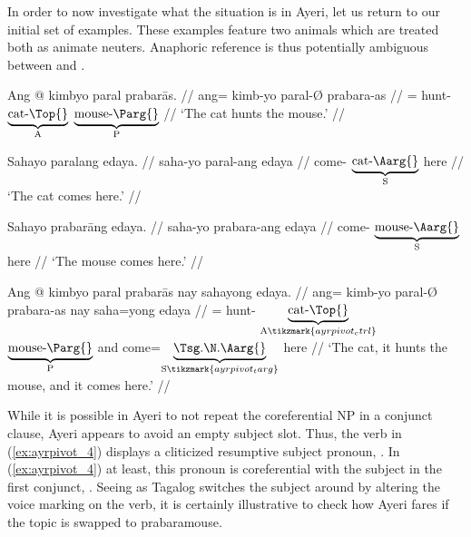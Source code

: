 In order to now investigate what the situation is in Ayeri, let us return to
our initial set of examples. These examples feature two animals which are
treated both as animate neuters. Anaphoric reference is thus potentially
ambiguous between  and .

\pex\label{ex:ayrpivot}%
\a\label{ex:ayrpivot_1}
	\begingl
		\gla Ang @ kimbyo paral prabarās. //
		\glb ang= kimb-yo paral-Ø prabara-as //
		\glc \AgtT{}= hunt-\TsgN{}
			$\underbrace{\text{cat-\Top{}}}_{\text{A}}$
			$\underbrace{\text{mouse-\Parg{}}}_{\text{P}}$ //
		\glft `The cat hunts the mouse.' //
	\endgl
	
\a\label{ex:ayrpivot_2}%
	\begingl
		\gla Sahayo paralang edaya. //
		\glb saha-yo paral-ang edaya //
		\glc come-\TsgN{} $\underbrace{\text{cat-\Aarg{}}}_{\text{S}}$
			here //
		\glft `The cat comes here.' //
	\endgl
	
\a\label{ex:ayrpivot_3}%
	\begingl
		\gla Sahayo prabarāng edaya. //
		\glb saha-yo prabara-ang edaya //
		\glc come-\TsgN{} $\underbrace{\text{mouse-\Aarg{}}}_{\text{S}}$
			here //
		\glft `The mouse comes here.' //
	\endgl
	
\a\label{ex:ayrpivot_4}%
	\begingl[aboveglftskip=1em]
		\gla Ang @ kimbyo paral prabarās nay sahayong edaya. //
		\glb ang= kimb-yo paral-Ø prabara-as nay saha=yong edaya  //
		\glc \AgtT{}= hunt-\TsgN{}
			$\underbrace{\text{cat-\Top{}}}_{\text{A}\tikzmark{ayrpivot_ctrl}}$
			$\underbrace{\text{mouse-\Parg{}}}_{\text{P}}$
			and
			come=$\underbrace{\text{\smash{\TsgN{}}.\Aarg{}}}_%
				{\text{S}\tikzmark{ayrpivot_targ}}$
			here //
		\glft `The cat, it hunts the mouse, and it comes here.' //
	\endgl

\xe

While it is possible in Ayeri to not repeat the coreferential NP in a conjunct
clause, Ayeri appears to avoid an empty subject slot. Thus, the verb 
 in (\ref{ex:ayrpivot_4}) displays a
cliticized resumptive subject pronoun, . In
(\ref{ex:ayrpivot_4}) at least, this pronoun is coreferential with the subject
in the first conjunct, . Seeing as Tagalog switches the
subject around by altering the voice marking on the verb, it is certainly
illustrative to check how Ayeri fares if the topic is swapped to 
{prabara}{mouse}.

